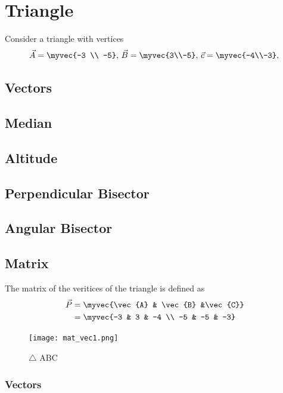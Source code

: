\documentclass[11pt]{book}
\begin{document}
\frontmatter
\tableofcontents
\setcounter{page}{1}
\mainmatter
\chapter{Triangle}
Consider a triangle with vertices
\begin{align}
\label{eq:tri-pts}
\vec{A}=\myvec{-3 \\ -5},\,
\vec{B}=\myvec{3\\-5},\,
	\vec{c}=\myvec{-4\\-3},\,
\end{align}

\section{Vectors}
\section{Median}
\section{Altitude}
\section{Perpendicular Bisector}
\section{Angular Bisector}
\section{Matrix}

The matrix of the veritices of the triangle is defined as
		\begin{align}
			\vec{P} &= \myvec{\vec{A} & \vec{B} &\vec{C}} \\
            &=\myvec{-3 & 3 & -4 \\ -5 & -5 & -3}
		\end{align}
\begin{figure}[H]
    \centering
    \texttt{[image: mat\_vec1.png]}
    \caption{$\triangle$ ABC}
    \label{fig:mat_vec1}
\end{figure}
\subsection{Vectors}
\end{document}
